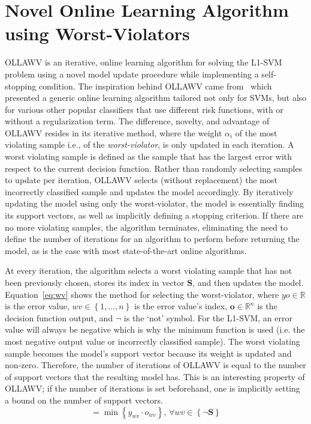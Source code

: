 \documentclass[reqno]{vcuthesis}
\newcommand{\set}[1]{{\left\{#1\right\}}}
\newcommand{\reals}{{\mathbb{R}}}
\numberwithin{equation}{chapter}
\begin{document}
\section{Novel Online Learning Algorithm using Worst-Violators}
OLLAWV is an iterative, online learning algorithm for solving the L1-SVM problem using a novel model update procedure while implementing a self-stopping condition. The inspiration behind OLLAWV came from~\cite{kecman2016fast} which presented a generic online learning algorithm tailored not only for SVMs, but also for various other popular classifiers that use different risk functions, with or without a regularization term. The difference, novelty, and advantage of OLLAWV resides in its iterative method, where the weight $\alpha_i$ of the most violating sample i.e., of the \textit{worst-violator}, is only updated in each iteration. A worst violating sample is defined as the sample that has the largest error with respect to the current decision function. Rather than randomly selecting samples to update per iteration, OLLAWV selects (without replacement) the most incorrectly classified sample and updates the model accordingly. By iteratively updating the model using only the worst-violator, the model is essentially finding its support vectors, as well as implicitly defining a stopping criterion. If there are no more violating samples, the algorithm terminates, eliminating the need to define the number of iterations for an algorithm to perform before returning the model, as is the case with most state-of-the-art online algorithms. 

At every iteration, the algorithm selects a worst violating sample that has not been previously chosen, stores its index in vector $\bm S$, and then updates the model. Equation~\ref{eq:wv} shows the method for selecting the worst-violator, where $yo \in \reals$ is the error value, $wv \in \set{1, \ldots, n}$ is the error value's index, $\bm o \in \reals^n$ is the decision function output, and $\neg$ is the `not' symbol. For the L1-SVM, an error value will always be negative which is why the minimum function is used (i.e. the most negative output value or incorrectly classified sample). The worst violating sample becomes the model's support vector because its weight is updated and non-zero. Therefore, the number of iterations of OLLAWV is equal to the number of support vectors that the resulting model has. This is an interesting property of OLLAWV; if the number of iterations is set beforehand, one is implicitly setting a bound on the number of support vectors. 
\begin{equation}
[yo, wv] = \min \set{y_{wv} \cdot o_{wv}},\, \forall wv \in \set{\neg \bm S}
\label{eq:wv}
\end{equation}
\end{document}
